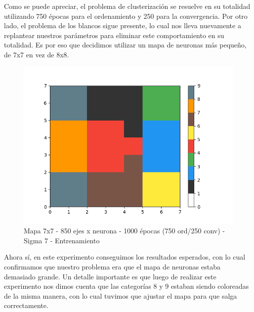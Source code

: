 Como se puede apreciar, el problema de clusterización se resuelve en su totalidad utilizando 750 épocas para el ordenamiento y 250 para la convergencia. Por otro lado, el problema de los blancos sigue presente, lo cual nos lleva nuevamente a replantear nuestros parámetros para eliminar este comportamiento en su totalidad. Es por eso que decidimos utilizar un mapa de neuronas más pequeño, de 7x7 en vez de 8x8. 

\begin{figure}[!htbp]
  \begin{center}
    \includegraphics[scale=0.6]{../img/map7x7_1000ep_850en_sigma7_faseord750.png}
  \caption{Mapa 7x7 - 850 ejes x neurona - 1000 épocas (750 ord/250 conv) - Sigma 7 - Entrenamiento}
  \end{center}
\end{figure}

Ahora sí, en este experimento conseguimos los resultados esperados, con lo cual confirmamos que nuestro problema era que el mapa de neuronas estaba demasiado grande. Un detalle importante es que luego de realizar este experimento nos dimos cuenta que las categorías 8 y 9 estaban siendo coloreadas de la misma manera, con lo cual tuvimos que ajustar el mapa para que salga correctamente.

